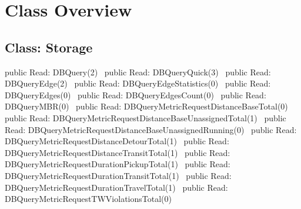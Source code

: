 \chapter*{Class Overview}
\label{overview}


\section*{Class: Storage}
\nwenddocs{}\endmoddef{}
public \LA{}Read: DBQuery(2)~{\nwtagstyle{}}\RA{}
public \LA{}Read: DBQueryQuick(3)~{\nwtagstyle{}}\RA{}
public \LA{}Read: DBQueryEdge(2)~{\nwtagstyle{}}\RA{}
public \LA{}Read: DBQueryEdgeStatistics(0)~{\nwtagstyle{}}\RA{}
public \LA{}Read: DBQueryEdges(0)~{\nwtagstyle{}}\RA{}
public \LA{}Read: DBQueryEdgesCount(0)~{\nwtagstyle{}}\RA{}
public \LA{}Read: DBQueryMBR(0)~{\nwtagstyle{}}\RA{}
public \LA{}Read: DBQueryMetricRequestDistanceBaseTotal(0)~{\nwtagstyle{}}\RA{}
public \LA{}Read: DBQueryMetricRequestDistanceBaseUnassignedTotal(1)~{\nwtagstyle{}}\RA{}
public \LA{}Read: DBQueryMetricRequestDistanceBaseUnassignedRunning(0)~{\nwtagstyle{}}\RA{}
public \LA{}Read: DBQueryMetricRequestDistanceDetourTotal(1)~{\nwtagstyle{}}\RA{}
public \LA{}Read: DBQueryMetricRequestDistanceTransitTotal(1)~{\nwtagstyle{}}\RA{}
public \LA{}Read: DBQueryMetricRequestDurationPickupTotal(1)~{\nwtagstyle{}}\RA{}
public \LA{}Read: DBQueryMetricRequestDurationTransitTotal(1)~{\nwtagstyle{}}\RA{}
public \LA{}Read: DBQueryMetricRequestDurationTravelTotal(1)~{\nwtagstyle{}}\RA{}
public \LA{}Read: DBQueryMetricRequestTWViolationsTotal(0)~{\nwtagstyle{}}\RA{}

